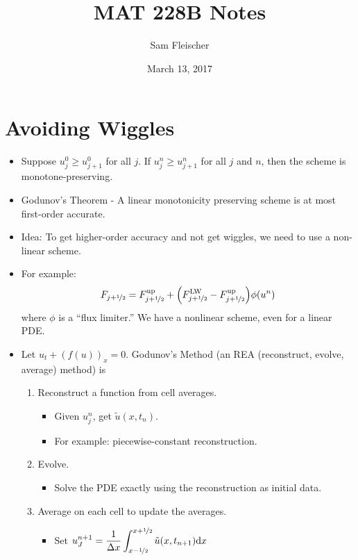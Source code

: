 \documentclass{article}
\title{MAT 228B Notes}
\author{Sam Fleischer}
\date{March 13, 2017}
\newcommand{\half}{\nicefrac{1}{2}}
\newcommand{\Dx}{\Delta x}
\begin{document}
    \maketitle

    \section{Avoiding Wiggles}

        \begin{itemize}
            \item Suppose $u_j^0 \geq u_{j+1}^0$ for all $j$.  If $u_j^n \geq u_{j+1}^n$ for all $j$ and $n$, then the scheme is monotone-preserving.
            \item Godunov's Theorem - A linear monotonicity preserving scheme is at most first-order accurate.
            \item Idea: To get higher-order accuracy and not get wiggles, we need to use a non-linear scheme.
            \item For example: $$F_{j+\half} = F_{j +\half}^\text{up} + \qty(F_{j+\half}^\text{LW} - F_{j+\half}^\text{up})\phi(u^n)$$ where $\phi$ is a ``flux limiter.''  We have a nonlinear scheme, even for a linear PDE.
            \item Let $u_t + (f(u))_x = 0$.  Godunov's Method (an REA (reconstruct, evolve, average) method) is
            \begin{enumerate}
                \item Reconstruct a function from cell averages.
                \begin{itemize}
                    \item Given $u_j^n$, get $\tilde{u}(x,t_n)$.
                    \item For example: piecewise-constant reconstruction.
                \end{itemize}
                \item Evolve.
                \begin{itemize}
                    \item Solve the PDE exactly using the reconstruction as initial data.
                \end{itemize}
                \item Average on each cell to update the averages.
                \begin{itemize}
                    \item Set $\displaystyle u_J^{n+1} = \frac{1}{\Dx}\int_{x-\half}^{x+\half}\tilde{u}(x,t_{n+1})\dd x$

\end{itemize}
\end{enumerate}
\end{itemize}
\end{document}
